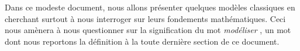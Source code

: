 Dans ce modeste document, nous allons présenter quelques modèles classiques en cherchant surtout à nous interroger sur leurs fondements mathématiques. Ceci nous amènera à nous questionner sur la signification du mot \emph{\og modéliser \fg{}} , un mot dont nous reportons la définition à la toute dernière section de ce document.
